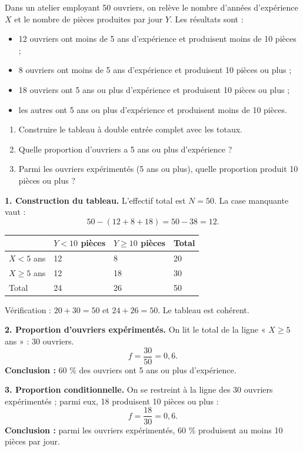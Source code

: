 \documentclass[11pt]{article}
\begin{document}
\begin{exoresolu}
Dans un atelier employant 50 ouvriers, on relève le nombre d'années d'expérience $X$ et le nombre de pièces produites par jour $Y$. Les résultats sont :
\begin{itemize}
\item 12 ouvriers ont moins de 5 ans d'expérience et produisent moins de 10 pièces ;
\item 8 ouvriers ont moins de 5 ans d'expérience et produisent 10 pièces ou plus ;
\item 18 ouvriers ont 5 ans ou plus d'expérience et produisent 10 pièces ou plus ;
\item les autres ont 5 ans ou plus d'expérience et produisent moins de 10 pièces.
\end{itemize}
\begin{enumerate}
\item Construire le tableau à double entrée complet avec les totaux.
\item Quelle proportion d'ouvriers a 5 ans ou plus d'expérience ?
\item Parmi les ouvriers expérimentés (5 ans ou plus), quelle proportion produit 10 pièces ou plus ?
\end{enumerate}
\tcblower
\textbf{1. Construction du tableau.} L'effectif total est $N = 50$. La case manquante vaut :
\[ 50 - (12 + 8 + 18) = 50 - 38 = 12. \]
\begin{center}
\begin{tabularx}{\linewidth}{|l|X|X|X|}
\hline
\rowcolor{popblueL} & $Y < 10$ pièces & $Y \geq 10$ pièces & Total \\
\hline
$X < 5$ ans & 12 & 8 & 20 \\
\hline
$X \geq 5$ ans & 12 & 18 & 30 \\
\hline
Total & 24 & 26 & 50 \\
\hline
\end{tabularx}
\end{center}
Vérification : $20 + 30 = 50$ et $24 + 26 = 50$. Le tableau est cohérent.

\textbf{2. Proportion d'ouvriers expérimentés.} On lit le total de la ligne « $X \geq 5$ ans » : 30 ouvriers.
\[ f = \frac{30}{50} = 0{,}6. \]
\textbf{Conclusion :} 60 \% des ouvriers ont 5 ans ou plus d'expérience.

\textbf{3. Proportion conditionnelle.} On se restreint à la ligne des 30 ouvriers expérimentés ; parmi eux, 18 produisent 10 pièces ou plus :
\[ f = \frac{18}{30} = 0{,}6. \]
\textbf{Conclusion :} parmi les ouvriers expérimentés, 60 \% produisent au moins 10 pièces par jour.
\end{exoresolu}
\end{document}
